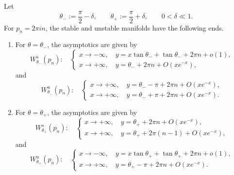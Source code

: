 \documentclass[10pt,a4paper]{amsart}
\begin{document}
\begin{prop}
\label{prop:gamma-generic-endpoints-W}
Let
\[
\theta_-:=\frac{\pi}{2}-\delta,
\qquad
\theta_+:=\frac{\pi}{2}+\delta,
\qquad
0<\delta\ll1.
\]
For \(p_n=2\pi i n\), the stable and unstable manifolds have the following ends.
\begin{enumerate}
\item For \(\theta=\theta_-\), the asymptotics are given by
\[
W^s_{\theta_-}(p_n):
\quad
\begin{cases}
x\to-\infty,\quad y=x\tan\theta_-+\tan\theta_-+2\pi n+o(1),\\[0.1cm]
x\to+\infty,\quad y=\theta_-+2\pi n+O(xe^{-x}),
\end{cases}
\]
and
\[
W^u_{\theta_-}(p_n):
\quad
\begin{cases}
x\to+\infty,\quad y=\theta_- -\pi+2\pi n+O(xe^{-x}),\\[0.1cm]
x\to+\infty,\quad y=\theta_- +\pi+2\pi n+O(xe^{-x}).
\end{cases}
\]
\item For \(\theta=\theta_+\), the asymptotics are given by
\[
W^s_{\theta_+}(p_n):
\quad
\begin{cases}
x\to+\infty,\quad y=\theta_+ +2\pi n+O(xe^{-x}),\\[0.1cm]
x\to+\infty,\quad y=\theta_+ +2\pi(n-1)+O(xe^{-x}),
\end{cases}
\]
and
\[
W^u_{\theta_+}(p_n):
\quad
\begin{cases}
x\to-\infty,\quad y=x\tan\theta_+ +\tan\theta_+ +2\pi n+o(1),\\[0.1cm]
x\to+\infty,\quad y=\theta_+-\pi+2\pi n+O(xe^{-x}).
\end{cases}
\]
\end{enumerate}
\end{prop}
\end{document}
